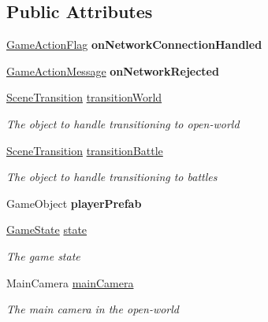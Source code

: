 \subsection*{Public Attributes}
\begin{DoxyCompactItemize}
\item 
\hypertarget{class_game_manager_a87d481fe88a1765f436ea5764cd1a21a}{\hyperlink{class_game_manager_1_1_game_action_flag}{Game\-Action\-Flag} {\bfseries on\-Network\-Connection\-Handled}}\label{class_game_manager_a87d481fe88a1765f436ea5764cd1a21a}

\item 
\hypertarget{class_game_manager_af977df043b83671ab9a4753b90fbf75b}{\hyperlink{class_game_manager_1_1_game_action_message}{Game\-Action\-Message} {\bfseries on\-Network\-Rejected}}\label{class_game_manager_af977df043b83671ab9a4753b90fbf75b}

\item 
\hyperlink{class_scene_transition}{Scene\-Transition} \hyperlink{class_game_manager_a59aeb9d1bcc8580f55f3f4dcdae396fd}{transition\-World}
\begin{DoxyCompactList}\small\item\em The object to handle transitioning to open-\/world \end{DoxyCompactList}\item 
\hyperlink{class_scene_transition}{Scene\-Transition} \hyperlink{class_game_manager_a1bd9eb164a33c054431f5bf8ccc8d3b8}{transition\-Battle}
\begin{DoxyCompactList}\small\item\em The object to handle transitioning to battles \end{DoxyCompactList}\item 
\hypertarget{class_game_manager_a57d400c7a28f42865048fbdbaf236cfb}{Game\-Object {\bfseries player\-Prefab}}\label{class_game_manager_a57d400c7a28f42865048fbdbaf236cfb}

\item 
\hyperlink{class_game_state}{Game\-State} \hyperlink{class_game_manager_a8d86b330237462e38933b28276ed0e2c}{state}
\begin{DoxyCompactList}\small\item\em The game state \end{DoxyCompactList}\item 
Main\-Camera \hyperlink{class_game_manager_aafd6b83529911d9e32cc4b79bd477d74}{main\-Camera}
\begin{DoxyCompactList}\small\item\em The main camera in the open-\/world \end{DoxyCompactList}\end{DoxyCompactItemize}
